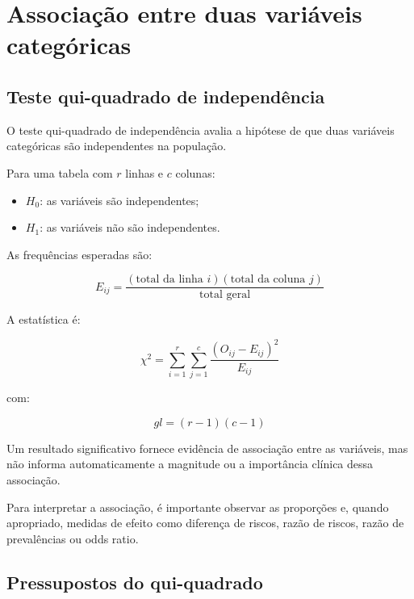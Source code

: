 \section{Associação entre duas variáveis categóricas}

\subsection{Teste qui-quadrado de independência}

O teste qui-quadrado de independência avalia a hipótese de que duas variáveis
categóricas são independentes na população.

\begin{definition}

Para uma tabela com $r$ linhas e $c$ colunas:

\begin{itemize}
    \item $H_0$: as variáveis são independentes;
    \item $H_1$: as variáveis não são independentes.
\end{itemize}

As frequências esperadas são:

\begin{equation}
  E_{ij}
=
\frac{
(\text{total da linha }i)
(\text{total da coluna }j)
}{
\text{total geral}
}
\end{equation}

A estatística é:


\begin{equation}
\chi^2=
\sum_{i=1}^{r}\sum_{j=1}^{c}
\frac{(O_{ij}-E_{ij})^2}{E_{ij}}
\end{equation}

com:

\begin{equation}
gl=(r-1)(c-1)
\end{equation}

\end{definition}

Um resultado significativo fornece evidência de associação entre as variáveis,
mas não informa automaticamente a magnitude ou a importância clínica dessa
associação.

Para interpretar a associação, é importante observar as proporções e, quando
apropriado, medidas de efeito como diferença de riscos, razão de riscos,
razão de prevalências ou odds ratio.

\subsection{Pressupostos do qui-quadrado}

